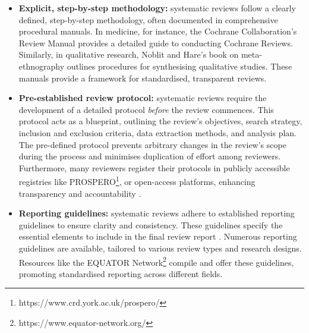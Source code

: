 \documentclass[10pt,oneside]{book}
\begin{document}
\begin{itemize}
    \item {\bf{Explicit, step-by-step methodology:}} systematic reviews follow a clearly defined, step-by-step methodology, often documented in comprehensive procedural manuals. In medicine, for instance, the Cochrane Collaboration's Review Manual \cite{lefebvre_cochrane_2011} provides a detailed guide to conducting Cochrane Reviews. Similarly, in qualitative research, Noblit and Hare's book on meta-ethnography \cite{noblit_meta-ethnography_1988} outlines procedures for synthesising qualitative studies. These manuals provide a framework for standardised, transparent reviews.
    \item {\bf{Pre-established review protocol:}} systematic reviews require the development of a detailed protocol {\it{before}} the review commences. This protocol acts as a blueprint, outlining the review's objectives, search strategy, inclusion and exclusion criteria, data extraction methods, and analysis plan. The pre-defined protocol prevents arbitrary changes in the review's scope during the process and minimises duplication of effort among reviewers. Furthermore, many reviewers register their protocols in publicly accessible registries like PROSPERO\footnote{https://www.crd.york.ac.uk/prospero/}, or open-access platforms, enhancing transparency and accountability \cite{tawfik_protocol_2020}.
    \item {\bf{Reporting guidelines:}} systematic reviews adhere to established reporting guidelines to ensure clarity and consistency. These guidelines specify the essential elements to include in the final review report \cite{moher_preferred_2010}. Numerous reporting guidelines are available, tailored to various review types and research designs. Resources like the EQUATOR Network\footnote{https://www.equator-network.org/} compile and offer these guidelines, promoting standardised reporting across different fields.
    

\end{itemize}
\end{document}
